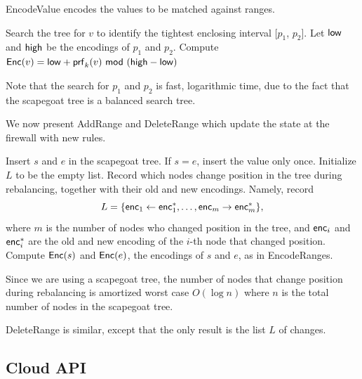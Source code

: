 EncodeValue encodes the values to be matched against ranges.

\begin{framed}
\begin{algorithmic}[1]

  \State Search the tree for $v$ to identify the tightest enclosing interval [$p_1$, $p_2$]. 
  \State Let $\mathsf{low}$ and $\mathsf{high}$ be the encodings of $p_1$ and $p_2$. 
  \State Compute $\enc(v) = \low + \prf_k(v)\ \mod\ (\high - \low)$
   \State {}
\EndProcedure

\end{algorithmic}
\end{framed}

Note that the search for $p_1$ and $p_2$ is fast, logarithmic time, due to the fact that the 
scapegoat tree is a balanced search tree. 

We now present AddRange and DeleteRange which update the state at the firewall with new rules. 

\begin{framed}
\begin{algorithmic}[1]

  \State Insert $s$ and $e$ in the scapegoat tree. If $s=e$, insert the value only once.
  \State Initialize $L$ to be the empty list.
  	\State Record which nodes change position in the tree during rebalancing, together with 
	their old and new encodings. Namely, record	\[L = \{ \mathsf{enc}_1 \leftarrow \mathsf{enc}^*_1, \dots, \mathsf{enc}_m \rightarrow \mathsf{enc}^*_m\},\] where $m$ is the number of nodes who changed position in the tree, and $\mathsf{enc}_i$ and $\mathsf{enc}^*_i$ are the old and new encoding of the $i$-th node that changed position. 
  \EndIf
  \State Compute  $\mathsf{Enc}(s)$ and $\mathsf{Enc}(e)$, the encodings of $s$ and $e$, as in EncodeRanges.
   \State {}
\EndProcedure

\end{algorithmic}
\end{framed}


Since we are using a scapegoat tree, the number of nodes that change position during rebalancing is amortized worst case $O(\log n)$ where $n$ is the total number of nodes in the scapegoat tree. 

DeleteRange is similar, except that the only result is the list $L$ of changes. 

\subsection{Cloud API}


